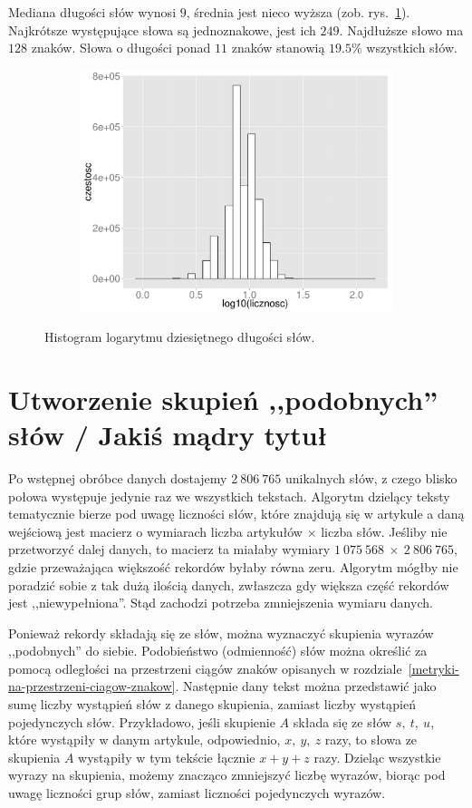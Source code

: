 \documentclass{praca1}
\begin{document}
Mediana długości słów wynosi $9$, średnia jest nieco wyższa (zob. rys.~\ref{plot:003}). Najkrótsze występujące słowa są jednoznakowe, jest ich $249$. Najdłuższe słowo ma $128$ znaków. Słowa o długości ponad $11$ znaków stanowią $19.5\%$ wszystkich słów.

\begin{figure}[!h]
  \centering
  \includegraphics[width=350pt, height=200pt]{plot3.pdf}\\
  \caption{Histogram logarytmu dziesiętnego długości słów.}\label{plot:003}
\end{figure}


\section{Utworzenie skupień ,,podobnych'' słów / Jakiś mądry tytuł}

Po wstępnej obróbce danych dostajemy $2\ 806\ 765$ unikalnych słów, z czego blisko połowa występuje jedynie raz we wszystkich tekstach. Algorytm dzielący teksty tematycznie bierze pod uwagę liczności słów, które znajdują się w artykule a daną wejściową jest macierz o wymiarach liczba artykułów $\times$ liczba słów. Jeśliby nie przetworzyć dalej danych, to macierz ta miałaby wymiary $1\ 075\ 568\ \times\ 2\ 806\ 765$, gdzie przeważająca większość rekordów byłaby równa zeru. Algorytm mógłby nie poradzić sobie z tak dużą ilością danych, zwłaszcza gdy większa część rekordów jest ,,niewypełniona''. Stąd zachodzi potrzeba zmniejszenia wymiaru danych. 

Ponieważ rekordy składają się ze słów, można wyznaczyć skupienia wyrazów ,,podobnych'' do siebie. Podobieństwo (odmienność) słów można określić za pomocą odległości na przestrzeni ciągów znaków opisanych w rozdziale~\ref{metryki-na-przestrzeni-ciagow-znakow}. Następnie dany tekst można przedstawić jako sumę liczby wystąpień słów z danego skupienia, zamiast liczby wystąpień pojedynczych słów. Przykładowo, jeśli skupienie $A$ składa się ze słów $s,\ t,\ u$, które wystąpiły w danym artykule, odpowiednio, $x,\ y,\ z$ razy, to słowa ze skupienia $A$ wystąpiły w tym tekście łącznie $x+y+z$ razy. Dzieląc wszystkie wyrazy na skupienia, możemy znacząco zmniejszyć liczbę wyrazów, biorąc pod uwagę liczności grup słów, zamiast liczności pojedynczych wyrazów.
\end{document}
